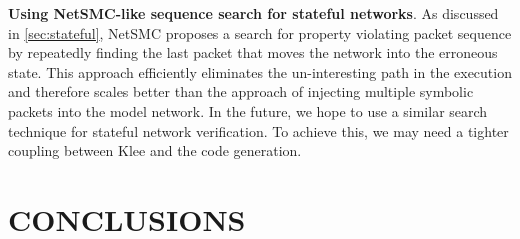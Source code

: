 \documentclass[letterpaper, 10 pt, conference]{ieeeconf}  %
\begin{document}
\textbf{Using NetSMC-like sequence search for stateful networks}.
As discussed in \ref{sec:stateful}, NetSMC\cite{NetSMC} proposes a search for property violating packet sequence by repeatedly finding the last packet that moves the network into the erroneous state. 
This approach efficiently eliminates the un-interesting path in the execution and therefore scales better than the approach of injecting multiple symbolic packets into the model network. 
In the future, we hope to use a similar search technique for stateful network verification. 
To achieve this, we may need a tighter coupling between Klee and the code generation. 

\section{CONCLUSIONS}\label{sec:c}




\addtolength{\textheight}{-12cm}  


\end{document}
